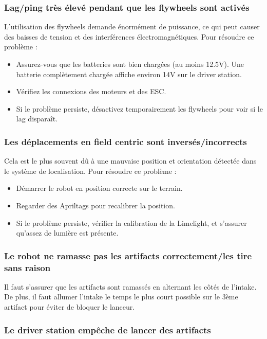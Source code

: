 \documentclass[12pt, a4paper]{report}
\begin{document}
    \subsubsection{Lag/ping très élevé pendant que les flywheels sont activés}

    L'utilisation des flywheels demande énormément de puissance, ce qui peut causer des baisses de tension et des interférences électromagnétiques. Pour résoudre ce problème :
    \begin{itemize}
        \item Assurez-vous que les batteries sont bien chargées (au moins 12.5V). Une batterie complètement chargée affiche environ 14V sur le driver station.
        \item Vérifiez les connexions des moteurs et des ESC.
        \item Si le problème persiste, désactivez temporairement les flywheels pour voir si le lag disparaît.
    \end{itemize}

    \subsubsection{Les déplacements en field centric sont inversés/incorrects}

    Cela est le plus souvent dû à une mauvaise position et orientation détectée dans le système de localisation. Pour résoudre ce problème :
    \begin{itemize}
        \item Démarrer le robot en position correcte sur le terrain.
        \item Regarder des Apriltags pour recalibrer la position.
        \item Si le problème persiste, vérifier la calibration de la Limelight, et s'assurer qu'assez de lumière est présente.
    \end{itemize}

    \subsubsection{Le robot ne ramasse pas les artifacts correctement/les tire sans raison}
    Il faut s'assurer que les artifacts sont ramassés en alternant les côtés de l'intake. De plus, il faut allumer l'intake le temps le plus court possible sur le 3ème artifact pour éviter de bloquer le lanceur.

    \subsubsection{Le driver station empêche de lancer des artifacts}
\end{document}
